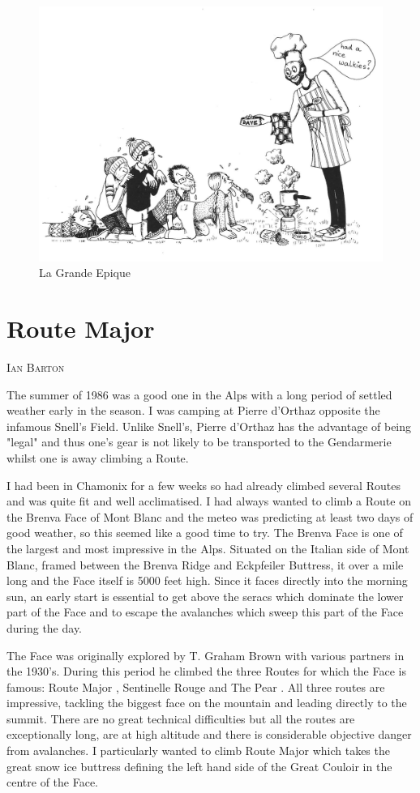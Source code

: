 \documentclass[a5paper,openany,font 10pt]{scrbook}
\makeatletter
\newcommand{\chapterauthor}[1]{%
{\parindent0pt\vspace*{-5pt}%
\linespread{1.1}\large\scshape#1%
\par\nobreak\vspace*{35pt}}
\@afterheading%
}
\makeatother
\begin{document}
\begin{figure}[htb]
\centering
\includegraphics[width=.9\linewidth]{./images/Cartoon_15.jpg}
\caption{\label{fig:org2966bba}
La Grande Epique}
\end{figure}

\chapter{Route Major}
\label{sec:org03609e9}
\chapterauthor{Ian Barton}

The summer of 1986 was a good one in the Alps with a long
period of settled weather early in the season. I was camping at
Pierre d'Orthaz opposite the infamous Snell's Field. Unlike
Snell's, Pierre d'Orthaz has the advantage of being "legal" and
thus one's gear is not likely to be transported to the
Gendarmerie whilst one is away climbing a Route.

I had been in Chamonix for a few weeks so had already
climbed several Routes and was quite fit and well acclimatised. I
had always wanted to climb a Route on the Brenva Face of Mont
Blanc and the meteo was predicting at least two days of good
weather, so this seemed like a good time to try. The Brenva Face
is one of the largest and most impressive in the Alps. Situated
on the Italian side of Mont Blanc, framed between the Brenva
Ridge and Eckpfeiler Buttress, it over a mile long and the Face
itself is 5000 feet high. Since it faces directly into the
morning sun, an early start is essential to get above the seracs
which dominate the lower part of the Face and to escape the
avalanches which sweep this part of the Face during the day.

The Face was originally explored by T. Graham Brown with
various partners in the 1930's. During this period he climbed the
three Routes for which the Face is famous:  Route Major ,
 Sentinelle Rouge  and  The Pear . All three routes are impressive,
tackling the biggest face on the mountain and leading directly to
the summit. There are no great technical difficulties but all the
routes are exceptionally long, are at high altitude and there is
considerable objective danger from avalanches. I particularly
wanted to climb  Route Major  which takes the great snow ice
buttress defining the left hand side of the Great Couloir in the
centre of the Face.
\end{document}
